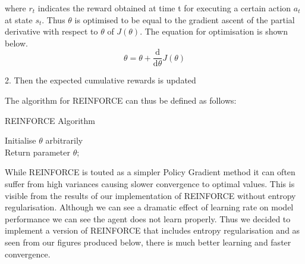 \documentclass{article}
\begin{document}
where $r_{t}$ indicates the reward obtained at time t for executing a certain action $a_t$ at state $s_t$.
Thus $\theta$ is optimised to be equal to the gradient ascent of the partial derivative with respect to $\theta$ of $J(\theta)$. The equation for optimisation is shown below.
\begin{equation}
\theta = \theta + \frac{\mathrm{d}  }{\mathrm{d} \theta} J(\theta)
\end{equation}

2. Then the expected cumulative rewards is updated 

The algorithm for REINFORCE can thus be defined as follows: 
\begin{algorithm}[htbp]
\caption{REINFORCE Algorithm}
\SetAlgoLined
\DontPrintSemicolon
\small %
Initialise $\theta$ arbitrarily\;\\
Return parameter $\theta$;
\end{algorithm}



While REINFORCE is touted as a simpler Policy Gradient method it can often suffer from high variances causing slower convergence to optimal values. This is visible from the results of our implementation of REINFORCE without entropy regularisation. Although we can see a dramatic effect of learning rate on model performance we can see the agent does not learn properly. Thus we decided to implement a version of REINFORCE that includes entropy regularisation and as seen from our figures produced below, there is much better learning and faster convergence. 




\end{document}
